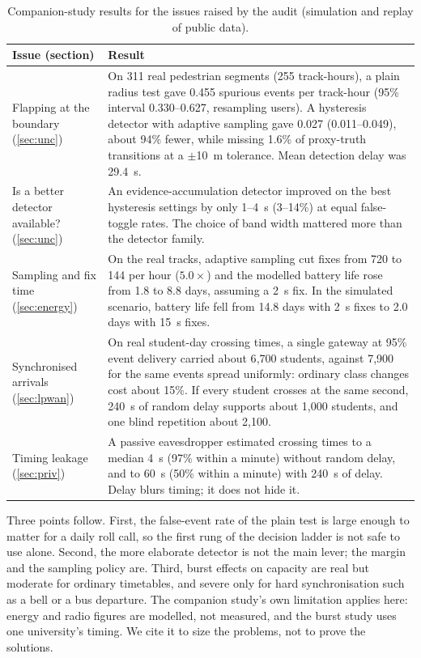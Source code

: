 \documentclass[preprint,12pt]{elsarticle}
\begin{document}
\begin{table}[tbp]\centering\footnotesize
\caption{Companion-study results for the issues raised by the audit (simulation and replay of public data).}\label{tab:case}
\begin{tabular}{@{}L{3.2cm}L{9.4cm}@{}}\toprule
Issue (section) & Result \\ \midrule
Flapping at the boundary (\ref{sec:unc}) & On 311 real pedestrian segments (255 track-hours), a plain radius test gave 0.455 spurious events per track-hour (95\% interval 0.330--0.627, resampling users). A hysteresis detector with adaptive sampling gave 0.027 (0.011--0.049), about 94\% fewer, while missing 1.6\% of proxy-truth transitions at a $\pm$10~m tolerance. Mean detection delay was 29.4~s. \\
Is a better detector available? (\ref{sec:unc}) & An evidence-accumulation detector improved on the best hysteresis settings by only 1--4~s (3--14\%) at equal false-toggle rates. The choice of band width mattered more than the detector family. \\
Sampling and fix time (\ref{sec:energy}) & On the real tracks, adaptive sampling cut fixes from 720 to 144 per hour ($5.0\times$) and the modelled battery life rose from 1.8 to 8.8 days, assuming a 2~s fix. In the simulated scenario, battery life fell from 14.8 days with 2~s fixes to 2.0 days with 15~s fixes. \\
Synchronised arrivals (\ref{sec:lpwan}) & On real student-day crossing times, a single gateway at 95\% event delivery carried about 6{,}700 students, against 7{,}900 for the same events spread uniformly: ordinary class changes cost about 15\%. If every student crosses at the same second, 240~s of random delay supports about 1{,}000 students, and one blind repetition about 2{,}100. \\
Timing leakage (\ref{sec:priv}) & A passive eavesdropper estimated crossing times to a median 4~s (97\% within a minute) without random delay, and to 60~s (50\% within a minute) with 240~s of delay. Delay blurs timing; it does not hide it. \\ \bottomrule
\end{tabular}
\end{table}

Three points follow. First, the false-event rate of the plain test is large enough to matter for a daily roll call, so the first rung of the decision ladder is not safe to use alone. Second, the more elaborate detector is not the main lever; the margin and the sampling policy are. Third, burst effects on capacity are real but moderate for ordinary timetables, and severe only for hard synchronisation such as a bell or a bus departure. The companion study's own limitation applies here: energy and radio figures are modelled, not measured, and the burst study uses one university's timing. We cite it to size the problems, not to prove the solutions.
\end{document}
